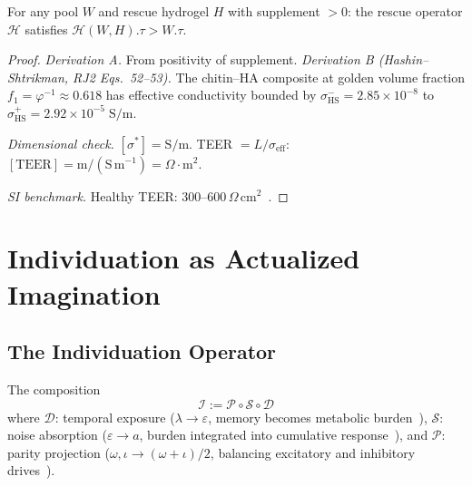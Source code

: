 \begin{theorem}
For any pool $W$ and rescue hydrogel $H$ with supplement $> 0$:
the rescue operator $\mathcal{H}$ satisfies
$\mathcal{H}(W, H).\tau > W.\tau$.

\begin{proof}
\emph{Derivation A.} From positivity of supplement.
\emph{Derivation B (Hashin--Shtrikman, RJ2 Eqs.~52--53).}
The chitin--HA composite at golden volume fraction $f_1 = \varphi^{-1} \approx 0.618$
has effective conductivity bounded by
$\sigma^-_\mathrm{HS} = 2.85\times10^{-8}$ to
$\sigma^+_\mathrm{HS} = 2.92\times10^{-5}\;\mathrm{S/m}$.

\emph{Dimensional check.} $[\sigma^*] = \mathrm{S/m}$. TEER $= L/\sigma_\mathrm{eff}$:
$[\mathrm{TEER}] = \mathrm{m/(S\,m^{-1})} = \Omega\cdot\mathrm{m}^2$. \checkmark

\emph{SI benchmark.}
Healthy TEER: 300--600\,$\Omega$\,cm$^2$~\cite{srinivasan15}.
\qedhere
\end{proof}
\end{theorem}

\section{Individuation as Actualized Imagination}

\subsection{The Individuation Operator}

\begin{definition}[Individuation]
The composition
\begin{equation}
  \mathcal{I} := \mathcal{P} \circ \mathcal{S} \circ \mathcal{D}
\end{equation}
where $\mathcal{D}$: temporal exposure ($\lambda \to \varepsilon$,
memory becomes metabolic burden~\cite{lc}),
$\mathcal{S}$: noise absorption ($\varepsilon \to a$,
burden integrated into cumulative response~\cite{lc}), and
$\mathcal{P}$: parity projection ($\omega, \iota \to (\omega+\iota)/2$,
balancing excitatory and inhibitory drives~\cite{dwm}).
\end{definition}

